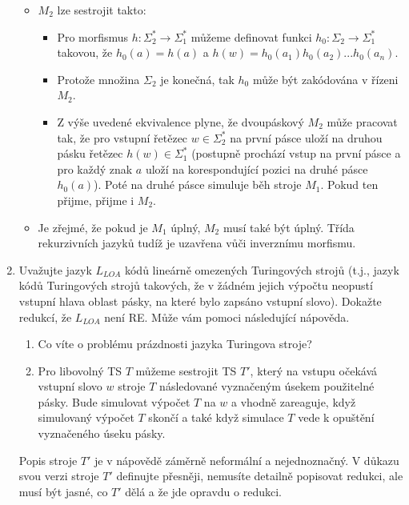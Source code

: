 \documentclass[a4paper,11pt]{article}[24.3.2010]
\begin{document}
\begin{enumerate}
\begin{itemize}
\item $M_{2}$ lze sestrojit takto:\\
\begin{itemize}
\item Pro morfismus $h : \Sigma_{2}^* \rightarrow \Sigma_{1}^*$ můžeme definovat funkci $h_{0} : \Sigma_{2} \rightarrow \Sigma_{1}^*$ takovou, že $h_{0}(a) = h(a)$ a $h(w) = h_{0}(a_{1})h_{0}(a_{2})...h_{0}(a_{n})$.\\
\item Protože množina $\Sigma_{2}$ je konečná, tak $h_{0}$ může být zakódována v řízeni $M_{2}$.\\
\item Z výše uvedené ekvivalence plyne, že dvoupáskový $M_{2}$ může pracovat tak, že pro vstupní řetězec $w \in \Sigma_{2}^*$ na první pásce uloží na druhou pásku řetězec $h(w) \in \Sigma_{1}^*$ (postupně prochází vstup na první pásce a pro každý znak $a$ uloží na korespondující pozici na druhé pásce $h_{0}(a)$). Poté na druhé pásce simuluje běh stroje $M_{1}$. Pokud ten přijme, přijme i $M_{2}$.\\
\end{itemize}
\item Je zřejmé, že pokud je $M_{1}$ úplný, $M_{2}$ musí také být úplný. Třída rekurzivních jazyků tudíž je uzavřena vůči inverznímu morfismu.
\end{itemize}

\newpage

\item Uvažujte jazyk $L_{LOA}$ kódů lineárně omezených Turingových strojů (t.j., jazyk kódů Turingových strojů takových, že v žádném jejich výpočtu neopustí vstupní hlava oblast pásky, na které bylo zapsáno vstupní slovo). Dokažte redukcí, že $L_{LOA}$ není RE. Může vám pomoci následující nápověda.
\renewcommand{\theenumi}{\alph{enumi}}
\begin{enumerate}
\item Co víte o problému prázdnosti jazyka Turingova stroje?
\item Pro libovolný TS $T$ můžeme sestrojit TS $T'$, který na vstupu očekává vstupní slovo $w$ stroje $T$ následované vyznačeným úsekem použitelné pásky. Bude simulovat výpočet $T$ na $w$ a vhodně zareaguje, když simulovaný výpočet $T$ skončí a také když simulace $T$ vede k opuštění vyznačeného úseku pásky.
\end{enumerate}
\renewcommand{\theenumi}{\arabic{enumi}}
Popis stroje $T'$ je v nápovědě záměrně neformální a nejednoznačný. V důkazu svou verzi stroje $T'$ definujte přesněji, nemusíte detailně popisovat redukci, ale musí být jasné, co $T'$ dělá a že jde opravdu o redukci.


\end{enumerate}
\end{document}
